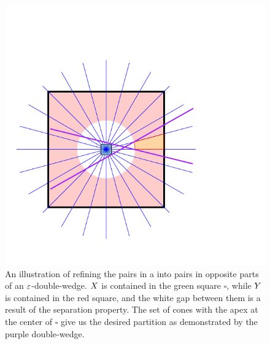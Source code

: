 \documentclass[12pt]{article}%
\begin{document}
\begin{figure}[ht]
    \centerline{\includegraphics{figs/partition}}
    \caption{An illustration of refining the pairs in a \SSPD into pairs in opposite parts of an $\varepsilon$-double-wedge. $X$ is contained in the green square $\square$, while $Y$ is contained in the red square, and the white gap between them is a result of the separation property. The set of cones with the apex at the center of $\square$ give us the desired partition as demonstrated by the purple double-wedge. }
\end{figure}
\end{document}

